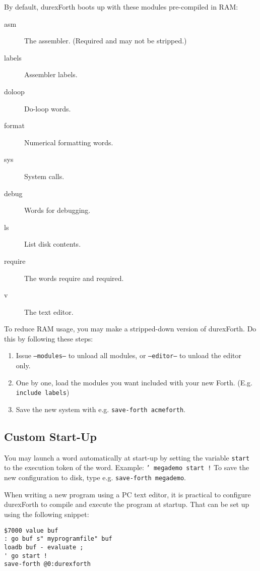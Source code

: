 By default, durexForth boots up with these modules pre-compiled in RAM:

\begin{description}
    \item[asm] The assembler. (Required and may not be stripped.)
    \item[labels] Assembler labels.
    \item[doloop] Do-loop words.
    \item[format] Numerical formatting words.
    \item[sys] System calls.
    \item[debug] Words for debugging.
    \item[ls] List disk contents.
    \item[require] The words require and required.
    \item[v] The text editor.
\end{description}

To reduce RAM usage, you may make a stripped-down version of durexForth. Do this by following these steps:

\begin{enumerate}
\item Issue \texttt{---modules---} to unload all modules, or \texttt{---editor---} to unload the editor only.
\item One by one, load the modules you want included with your new Forth. (E.g. \texttt{include labels})
\item Save the new system with e.g. \texttt{save-forth acmeforth}.
\end{enumerate}

\subsection{Custom Start-Up}

You may launch a word automatically at start-up by setting the variable \texttt{start} to the execution token of the word.  Example: \texttt{' megademo start !} To save the new configuration to disk, type e.g. \texttt{save-forth megademo}.

When writing a new program using a PC text editor, it is practical to configure durexForth to compile and execute the program at startup. That can be set up using the following snippet:

\begin{verbatim}
$7000 value buf
: go buf s" myprogramfile" buf
loadb buf - evaluate ;
' go start !
save-forth @0:durexforth
\end{verbatim}

